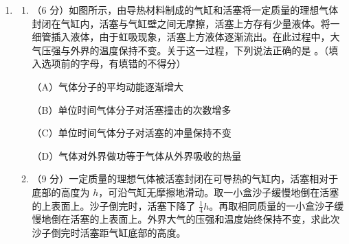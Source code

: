 \documentclass[\gkver]{gaokaozhenti}
\begin{document}
\begin{enumerate}
{（Ⅱ）设 $G$ 为木条重心，由题意可知 $AG=\frac{1}{2}l$（④）。当木条 A 端刚刚离开斜面时，若满足 $Mg\cdot OA\cos\theta>mg\cdot OB\cos\theta+mg\cdot OG\cos\theta$（⑤），木条就不会脱离斜面。联立②④⑤并代入已知条件得 $OA>0.25\Um$（⑥）。
}

\item
\begin{enumerate}
	\item
	（6 分）如图所示，由导热材料制成的气缸和活塞将一定质量的理想气体封闭在气缸内，活塞与气缸壁之间无摩擦，活塞上方存有少量液体。将一细管插入液体，由于虹吸现象，活塞上方液体逐渐流出。在此过程中，大气压强与外界的温度保持不变。关于这一过程，下列说法正确的是 \tkanswer[1.0cm]{}。（填入选项前的字母，有填错的不得分）
	
	
	（A）气体分子的平均动能逐渐增大
	
	（B）单位时间气体分子对活塞撞击的次数增多
	
	（C）单位时间气体分子对活塞的冲量保持不变
	
	（D）气体对外界做功等于气体从外界吸收的热量
	
	\item
	（9 分）一定质量的理想气体被活塞封闭在可导热的气缸内，活塞相对于底部的高度为 $h$，可沿气缸无摩擦地滑动。取一小盒沙子缓慢地倒在活塞的上表面上。沙子倒完时，活塞下降了 $\frac{1}{4}h$。再取相同质量的一小盒沙子缓慢地倒在活塞的上表面上。外界大气的压强和温度始终保持不变，求此次沙子倒完时活塞距气缸底部的高度。
	
\end{enumerate}




\end{enumerate}
\end{document}
